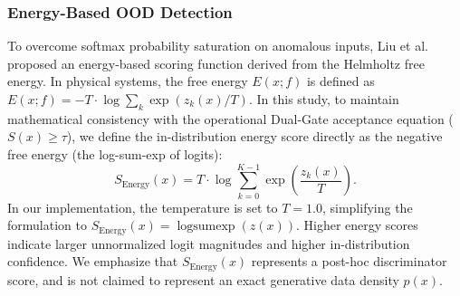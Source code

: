 \subsubsection{Energy-Based OOD Detection}
To overcome softmax probability saturation on anomalous inputs, Liu et al. \cite{liu2020energy} proposed an energy-based scoring function derived from the Helmholtz free energy. In physical systems, the free energy $E(x; f)$ is defined as $E(x; f) = -T \cdot \log \sum_k \exp(z_k(x) / T)$. In this study, to maintain mathematical consistency with the operational Dual-Gate acceptance equation ($S(x) \ge \tau$), we define the in-distribution energy score directly as the negative free energy (the log-sum-exp of logits):
\begin{equation}
S_{\text{Energy}}(x) = T \cdot \log \sum_{k=0}^{K-1} \exp\left(\frac{z_k(x)}{T}\right).
\end{equation}
In our implementation, the temperature is set to $T = 1.0$, simplifying the formulation to $S_{\text{Energy}}(x) = \operatorname{logsumexp}(z(x))$. Higher energy scores indicate larger unnormalized logit magnitudes and higher in-distribution confidence. We emphasize that $S_{\text{Energy}}(x)$ represents a post-hoc discriminator score, and is not claimed to represent an exact generative data density $p(x)$.

